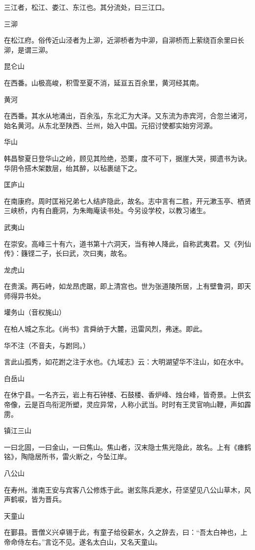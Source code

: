 \documentclass[a4paper,12pt,UTF8,twoside]{ctexbook}
\begin{document}
三江者，松江、娄江、东江也。其分流处，曰三江口。

三泖

在松江府。俗传近山泾者为上泖，近泖桥者为中泖，自泖桥而上萦绕百余里曰长泖，是谓三泖。

昆仑山

在西番。山极高峻，积雪至夏不消，延亘五百余里，黄河经其南。

黄河

在西番。其水从地涌出，百余泓，东北汇为大泽。又东流为赤宾河，合忽兰诸河，始名黄河。从东北至陕西、兰州，始入中国。元招讨使都实始穷河源。

华山

韩昌黎夏日登华山之岭，顾见其险绝，恐栗，度不可下，据崖大哭，掷遗书为诀。华阴令搭木架数层，绐其醉，以毡裹缒下之。

匡庐山

在南康府。周时匡裕兄弟七人结庐隐此，故名。志中言有二胜，开元漱玉亭、栖贤三峡桥，内有白鹿洞，为朱晦庵读书处。今另设学校，以教习诸生。

武夷山

在崇安。高峰三十有六，道书第十六洞天，当有神人降此，自称武夷君。又《列仙传》：籛铿二子，长曰武，次曰夷，故名。

龙虎山

在贵溪。两石峙，如龙昂虎踞，即上清宫也。世为张道陵所居，上有壁鲁洞，即天师得异书处。

壦务山（音权旄山）

在柏人城之东北。《尚书》言舜纳于大麓，迅雷风烈，弗迷。即此。

华不注（不音夫，与跗同。）

言此山孤秀，如花跗之注于水也。《九域志》云：大明湖望华不注山，如在水中。

白岳山

在休宁县。一名齐云，岩上有石钟楼、石鼓楼、香炉峰、烛台峰，皆奇景。上供玄帝像，云是百鸟衔泥所塑，灵应异常，人称小武当。时时有王灵官响山鞭，声如霹雳。

镇江三山

一曰北固，一曰金山，一曰焦山。焦山者，汉末隐士焦光隐此，故名。上有《瘗鹤铭》，陶隐居所书，雷火断之，今坠江岸。

八公山

在寿州。淮南王安与宾客八公修炼于此。谢玄陈兵淝水，苻坚望见八公山草木，风声鹤唳，皆为晋兵。

天童山

在鄞县。晋僧义兴卓锡于此，有童子给役薪水，久之辞去，曰：“吾太白神也，上帝命侍左右。”言讫不见。遂名太白山，又名天童山。
\end{document}
